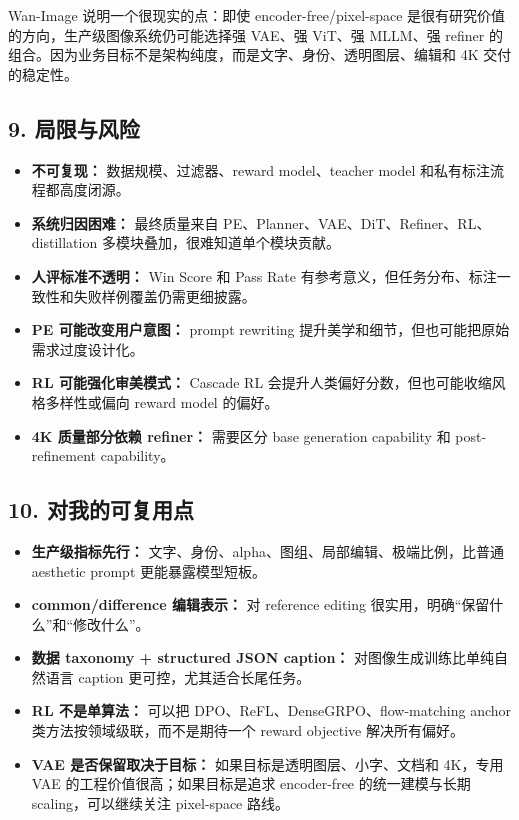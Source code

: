 Wan-Image 说明一个很现实的点：即使 encoder-free/pixel-space 是很有研究价值的方向，生产级图像系统仍可能选择强 VAE、强 ViT、强 MLLM、强 refiner 的组合。因为业务目标不是架构纯度，而是文字、身份、透明图层、编辑和 4K 交付的稳定性。

\subsection{9. 局限与风险}

\begin{itemize}[leftmargin=1.5em]
  \item \textbf{不可复现：} 数据规模、过滤器、reward model、teacher model 和私有标注流程都高度闭源。
  \item \textbf{系统归因困难：} 最终质量来自 PE、Planner、VAE、DiT、Refiner、RL、distillation 多模块叠加，很难知道单个模块贡献。
  \item \textbf{人评标准不透明：} Win Score 和 Pass Rate 有参考意义，但任务分布、标注一致性和失败样例覆盖仍需更细披露。
  \item \textbf{PE 可能改变用户意图：} prompt rewriting 提升美学和细节，但也可能把原始需求过度设计化。
  \item \textbf{RL 可能强化审美模式：} Cascade RL 会提升人类偏好分数，但也可能收缩风格多样性或偏向 reward model 的偏好。
  \item \textbf{4K 质量部分依赖 refiner：} 需要区分 base generation capability 和 post-refinement capability。
\end{itemize}

\subsection{10. 对我的可复用点}

\begin{itemize}[leftmargin=1.5em]
  \item \textbf{生产级指标先行：} 文字、身份、alpha、图组、局部编辑、极端比例，比普通 aesthetic prompt 更能暴露模型短板。
  \item \textbf{common/difference 编辑表示：} 对 reference editing 很实用，明确“保留什么”和“修改什么”。
  \item \textbf{数据 taxonomy + structured JSON caption：} 对图像生成训练比单纯自然语言 caption 更可控，尤其适合长尾任务。
  \item \textbf{RL 不是单算法：} 可以把 DPO、ReFL、DenseGRPO、flow-matching anchor 类方法按领域级联，而不是期待一个 reward objective 解决所有偏好。
  \item \textbf{VAE 是否保留取决于目标：} 如果目标是透明图层、小字、文档和 4K，专用 VAE 的工程价值很高；如果目标是追求 encoder-free 的统一建模与长期 scaling，可以继续关注 pixel-space 路线。
\end{itemize}

